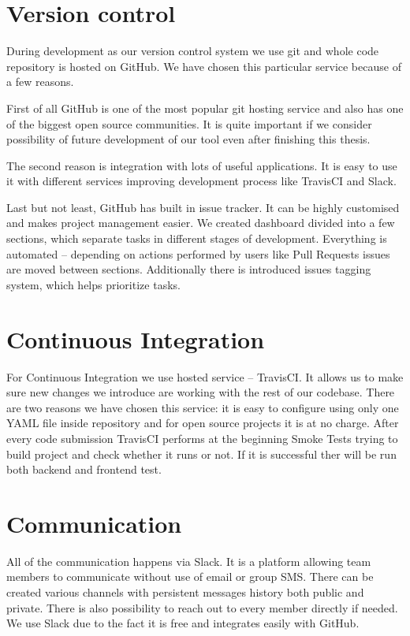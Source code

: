 \documentclass[licencjacka,en]{thesisclass}
\begin{document}
    \section{Version control}

    During development as our version control system we use git and whole code repository is hosted on GitHub. We have chosen this particular service because of a few reasons.

    First of all GitHub is one of the most popular git hosting service and also has one of the biggest open source communities. It is quite important if we consider possibility of future development of our tool even after finishing this thesis.

    The second reason is integration with lots of useful applications. It is easy to use it with different services improving development process like TravisCI and Slack.

    Last but not least, GitHub has built in issue tracker. It can be highly customised and makes project management easier. We created dashboard divided into a few sections, which separate tasks in different stages of development. Everything is automated -- depending on actions performed by users like Pull Requests issues are moved between sections. Additionally there is introduced issues tagging system, which helps prioritize tasks.

    \section{Continuous Integration}

    For Continuous Integration we use hosted service -- TravisCI. It allows us to make sure new changes we introduce are working with the rest of our codebase. There are two reasons we have chosen this service: it is easy to configure using only one YAML file inside repository and for open source projects it is at no charge. After every code submission TravisCI performs at the beginning Smoke Tests trying to build project and check whether it runs or not. If it is successful ther will be run both backend and frontend test.

    \section{Communication}

    All of the communication happens via Slack. It is a platform allowing team members to communicate without use of email or group SMS. There can be created various channels with persistent messages history both public and private. There is also possibility to reach out to every member directly if needed. We use Slack due to the fact it is free and integrates easily with GitHub.
\end{document}
